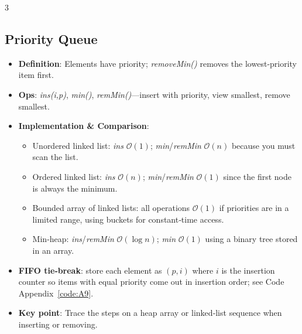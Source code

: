 \documentclass[6pt,landscape]{article}
\newcommand{\bigO}[1]{\ensuremath{\mathcal{O}(#1)}}
\newcommand{\keyword}[1]{\textbf{\textcolor{keywordcolor}{#1}}}
\newcommand{\op}[1]{\textit{\textcolor{opcolor}{#1}}}
\begin{document}
\begin{multicols}{3}
\subsection{Priority Queue}\label{sec:pq}
\begin{itemize}
  \item \keyword{Definition}: Elements have priority; \op{removeMin()} removes the lowest‐priority item first.
  \item \textbf{Ops}: \op{ins(i,p)}, \op{min()}, \op{remMin()}—insert with priority, view smallest, remove smallest.
  \item \textbf{Implementation \& Comparison}:
    \begin{itemize}
      \item Unordered linked list: \op{ins} \bigO{1}; \op{min}/\op{remMin} \bigO{n} because you must scan the list.
      \item Ordered linked list: \op{ins} \bigO{n}; \op{min}/\op{remMin} \bigO{1} since the first node is always the minimum.
      \item Bounded array of linked lists: all operations \bigO{1} if priorities are in a limited range, using buckets for constant‐time access.
      \item Min‐heap: \op{ins}/\op{remMin} \bigO{\log n}; \op{min} \bigO{1} using a binary tree stored in an array.
    \end{itemize}
  \item \textbf{FIFO tie‐break}: store each element as \((p,i)\) where \(i\) is the insertion counter so items with equal priority come out in insertion order; see Code Appendix~\ref{code:A9}.
  \item \textbf{Key point}: Trace the steps on a heap array or linked‐list sequence when inserting or removing.
\end{itemize}



\end{multicols}
\end{document}
